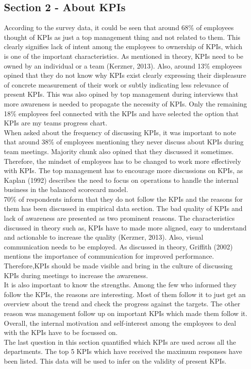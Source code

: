 \subsection{Section 2 - About KPIs}
According to the survey data, it could be seen that around 68\% of employees thought of KPIs as just a top management thing and not related to them. This clearly signifies lack of intent among the employees to ownership of KPIs, which is one of the important characteristics. As mentioned in theory, KPIs need to be owned by an individual or a team (Kerzner, 2013). Also, around 13\% employees opined that they do not know why KPIs exist clearly expressing their displeasure of concrete measurement of their work or subtly indicating less relevance of present KPIs. This was also opined by top management during interviews  that more awareness is needed to propagate the necessity of KPIs. Only the remaining 18\% employees feel connected with the KPIs and have selected the option that KPIs are my teams progress chart.\\
When asked about the frequency of discussing KPIs, it was important to note that around 38\% of employees mentioning they never discuss about KPIs during team meetings. Majority chunk also opined that they discussed it sometimes. Therefore, the mindset of employees has to be changed to work more effectively with KPIs. The top management has to encourage more discussions on KPIs, as Kaplan (1992) describes the need to focus on operations to handle the internal business in the balanced scorecard model.\\
70\% of respondents inform that they do not follow the KPIs and the reasons for them has been discussed in empirical data section. The bad quality of KPIs and lack of awareness are presented as two prominent reasons. The characteristics discussed in theory such as, KPIs have to made more aligned, easy to understand and actionable to increase the quality (Kerzner, 2013). Also, visual communication needs to be employed. As discussed in theory, Griffith (2002) mentions the importance of communication for improved performance. Therefore,KPIs should be made visible and bring in the culture of discussing KPIs during meetings to increase the awareness. \\
It is also important to know the strengths. Among the few who informed they follow the KPIs, the reasons are interesting. Most of them follow it to just get an overview about the trend and check the progress against the targets. The other reason was management follow up on important KPIs which made them follow it. Overall, the internal motivation and self-interest among the employees to deal with the KPIs have to be focussed on.\\
The last question in this section quantified which KPIs are used across all the departments. The top 5 KPIs which have received the maximum responses have been listed. This data will be used to infer on the validity of present KPIs.\\

